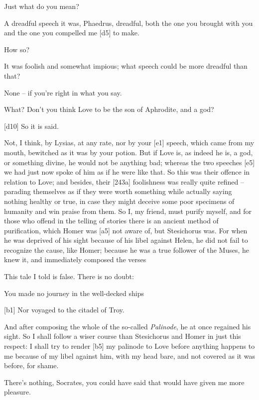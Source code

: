  Just what do you mean?

 A dreadful speech it was, Phaedrus, dreadful, both the one you
brought with you and the one you compelled me {[}d5{]} to make.

 How so?

 It was foolish and somewhat impious; what speech could be more
dreadful than that?

 None -- if you're right in what you say.

 What? Don't you think Love to be the son of Aphrodite, and a
god?

{[}d10{]}  So it is said.

 Not, I think, by Lysias, at any rate, nor by your {[}e1{]}
speech, which came from my mouth, bewitched as it was by your
potion. But if Love is,
as indeed he is, a god, or something divine, he would not be anything
bad; whereas the two speeches {[}e5{]} we had just now spoke of him as
if he were like that. So this was their offence in relation to Love; and
besides, their {[}243a{]} foolishness was really quite refined --
parading themselves as if they were worth something while actually
saying nothing healthy or true, in case they might deceive some poor
specimens of humanity and win praise from them. So I, my friend, must
purify myself, and for those who offend in the telling of stories there
is an ancient method of purification, which Homer was {[}a5{]} not aware
of, but Stesichorus was.
For when he was deprived of his sight because of his libel against
Helen, he did not fail to recognize the cause, like Homer; because he
was a true follower of the
Muses, he knew it, and
immediately composed the verses

This tale I told is false. There is no doubt:

You made no journey in the well-decked ships

{[}b1{]} Nor voyaged to the citadel of
Troy.

And after composing the whole of the so-called
{\em Palinode}, he at
once regained his sight. So I shall follow a wiser course than
Stesichorus and Homer in just this respect: I shall try to render
{[}b5{]} my palinode to Love before anything happens to me because of my
libel against him, with my head bare, and not covered as it was before,
for shame.

 There's nothing, Socrates, you could have said that would have
given me more pleasure.

